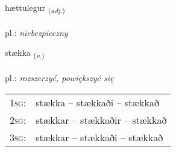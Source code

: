 \documentclass[frontgrid, backgrid]{flacards}\usepackage[]{graphicx}\usepackage[]{xcolor}
\begin{document}
\renewcommand{\blhead}{\vskip5pt {\small\bfseries\footnotesize Lýsingarorð | Adjective }}
\renewcommand{\bcfoot}{\vskip5pt \hspace{2pt}{\small\bfseries\footnotesize 2K}}


{hættulegur \small{\textsubscript{(\textit{adj.})}} \\[1ex] %
\textphonetic{[haihtʏlɛɣʏr]} \\
pl.: \emph{niebezpieczny} \\  [2ex]
\renewcommand*{\arraystretch}{0.8}
}

\renewcommand{\flhead}{\vskip5pt \fboxsep=0pt {\small\bfseries\footnotesize Sagnorð | Verb}}
\renewcommand{\fcfoot}{\vskip5pt \fboxsep=0pt \hspace{2pt}{\small\bfseries\footnotesize 2K}}

\renewcommand{\blhead}{\vskip5pt {\small\bfseries\footnotesize Sagnorð | Verb }}
\renewcommand{\bcfoot}{\vskip5pt \hspace{2pt}{\small\bfseries\footnotesize 2K}}


{stækka \small{\textsubscript{(\textit{v.})}} \\[1ex] %
\textphonetic{[staihka]} \\
pl.: \emph{rozszerzyć, powiększyć się} \\  [2ex]
\renewcommand*{\arraystretch}{0.8}
\begin{tabular}{p{1cm}l}
\textsc{1sg}: & stækka -- stækkaði -- stækkað \\ 
\textsc{2sg}: & stækkar -- stækkaðir -- stækkað \\ 
\textsc{3sg}: & stækkar -- stækkaði -- stækkað \\ 
\end{tabular}
}
\end{document}
